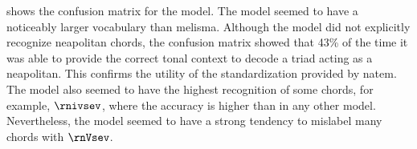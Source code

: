 
 shows the confusion
matrix for the \textcite{chen2021attend} model. The model
seemed to have a noticeably larger vocabulary than
\gls{melisma}. Although the model did not explicitly
recognize \gls{neapolitan} chords, the confusion matrix
showed that 43\% of the time it was able to provide the
correct tonal context to decode a triad acting as a
\gls{neapolitan}. This confirms the utility of the
standardization provided by \gls{natem}. The
\textcite{chen2021attend} model also seemed to have the
highest recognition of some chords, for example, $\rnivsev$,
where the accuracy is higher than in any other model.
Nevertheless, the model seemed to have a strong tendency to
mislabel many chords with $\rnVsev$.

